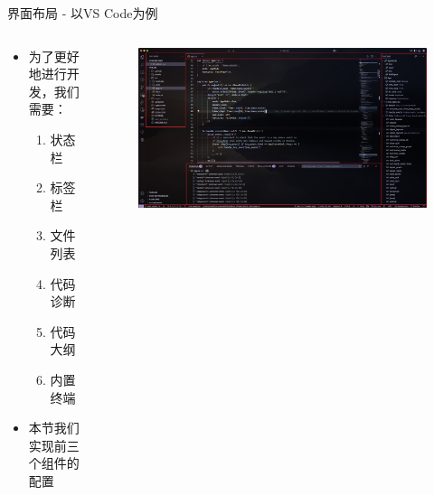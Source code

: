 \documentclass[aspectratio=169]{ctexbeamer}
\begin{document}
    \begin{frame}{界面布局 - 以VS Code为例}

      \begin{columns}
        \begin{column}{0.25\linewidth}
          \begin{itemize}
            \item 为了更好地进行开发，我们需要：%
              \begin{enumerate}[label=\arabic*.]
                \item 状态栏
                \item 标签栏
                \item 文件列表
                \item 代码诊断
                \item 代码大纲
                \item 内置终端
              \end{enumerate}
            \item 本节我们实现前三个组件的配置
          \end{itemize}
        \end{column}

        \begin{column}{0.75\linewidth}
          \begin{figure}[H]
            \centering
            \includegraphics[width=0.9\linewidth]{./Figures/VSCode_interface_annotated.jpg}
          \end{figure}
        \end{column}
      \end{columns}

    \end{frame}
\end{document}
